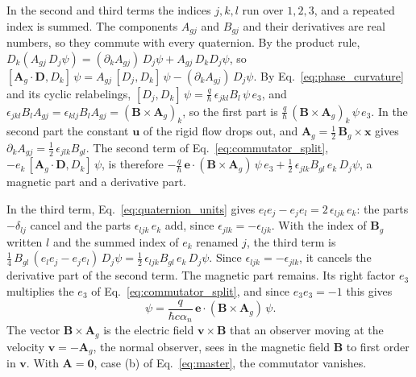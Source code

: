 \documentclass[aps,prd,onecolumn,tightenlines,nofootinbib,notitlepage,11pt,floatfix]{revtex4-2}
\theoremstyle{indentedtheorem}
\begin{document}
In the second and third terms the indices $j,k,l$ run over $1,2,3$, and a repeated index is summed. The components $A_{gj}$ and $B_{gj}$ and their derivatives are real numbers, so they commute with every quaternion. By the product rule, $D_k(A_{gj} \, D_j\psi)=(\partial_kA_{gj}) \, D_j\psi+A_{gj} \, D_kD_j\psi$, so $[\mathbf{A}_g\cdot\mathbf{D},D_k] \, \psi=A_{gj} \, [D_j,D_k] \, \psi-(\partial_kA_{gj}) \, D_j\psi$. By Eq.~\eqref{eq:phase_curvature} and its cyclic relabelings, $[D_j,D_k]\,\psi=\tfrac{q}{\hbar}\,\epsilon_{jkl}B_l\,\psi\,e_3$, and $\epsilon_{jkl}B_lA_{gj}=\epsilon_{klj}B_lA_{gj}=(\mathbf{B}\times\mathbf{A}_g)_k$, so the first part is $\tfrac{q}{\hbar}\,(\mathbf{B}\times\mathbf{A}_g)_k\,\psi\,e_3$. In the second part the constant $\mathbf{u}$ of the rigid flow drops out, and $\mathbf{A}_g=\tfrac{1}{2}\,\mathbf{B}_g\times\mathbf{x}$ gives $\partial_kA_{gj}=\tfrac{1}{2}\,\epsilon_{jlk}B_{gl}$. The second term of Eq.~\eqref{eq:commutator_split}, $-e_k\,[\mathbf{A}_g\cdot\mathbf{D},D_k]\,\psi$, is therefore $-\tfrac{q}{\hbar}\,\mathbf{e}\cdot(\mathbf{B}\times\mathbf{A}_g) \, \psi \, e_3+\tfrac{1}{2}\,\epsilon_{jlk}B_{gl}\,e_k\,D_j\psi$, a magnetic part and a derivative part.

In the third term, Eq.~\eqref{eq:quaternion_units} gives $e_le_j-e_je_l=2\,\epsilon_{ljk}\,e_k$: the parts $-\delta_{lj}$ cancel and the parts $\epsilon_{ljk}\,e_k$ add, since $\epsilon_{jlk}=-\epsilon_{ljk}$. With the index of $\mathbf{B}_g$ written $l$ and the summed index of $e_k$ renamed $j$, the third term is $\tfrac{1}{4}\,B_{gl}\,(e_le_j-e_je_l)\,D_j\psi=\tfrac{1}{2}\,\epsilon_{ljk}B_{gl}\,e_k\,D_j\psi$. Since $\epsilon_{ljk}=-\epsilon_{jlk}$, it cancels the derivative part of the second term. The magnetic part remains. Its right factor $e_3$ multiplies the $e_3$ of Eq.~\eqref{eq:commutator_split}, and since $e_3e_3=-1$ this gives
\begin{equation}
    [\mathsf{N},\mathsf{X}] \, \psi = \frac{q}{\hbar c\alpha_n} \, \mathbf{e}\cdot(\mathbf{B}\times\mathbf{A}_g) \, \psi .
    \label{eq:commutator_rigid}
\end{equation}
The vector $\mathbf{B}\times\mathbf{A}_g$ is the electric field $\mathbf{v}\times\mathbf{B}$ that an observer moving at the velocity $\mathbf{v}=-\mathbf{A}_g$, the normal observer, sees in the magnetic field $\mathbf{B}$ to first order in $\mathbf{v}$. With $\mathbf{A}=\mathbf{0}$, case (b) of Eq.~\eqref{eq:master}, the commutator vanishes.
\end{document}
